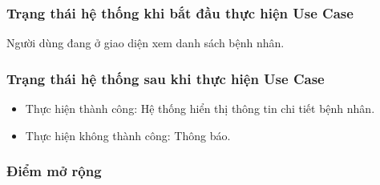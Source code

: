 \subsubsection{Trạng thái hệ thống khi bắt đầu thực hiện Use Case}
Người dùng đang ở giao diện xem danh sách bệnh nhân.

\subsubsection{Trạng thái hệ thống sau khi thực hiện Use Case}
\begin{itemize}
  \item Thực hiện thành công: Hệ thống hiển thị thông tin chi tiết bệnh nhân.
  \item Thực hiện không thành công: Thông báo.
\end{itemize}

\subsubsection{Điểm mở rộng}